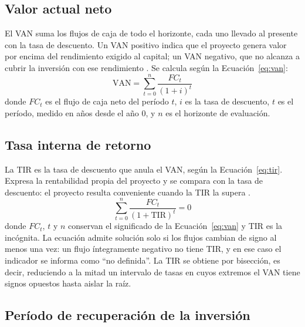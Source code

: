 \subsection{Valor actual neto}

El VAN suma los flujos de caja de todo el horizonte, cada uno llevado al presente con la tasa de descuento. Un VAN positivo indica que el proyecto genera valor por encima del rendimiento exigido al capital; un VAN negativo, que no alcanza a cubrir la inversión con ese rendimiento \parencite{RossEtAl2013}. Se calcula según la Ecuación~\eqref{eq:van}:
\begin{equation}
  \label{eq:van}
  \text{VAN} = \sum_{t=0}^{n} \frac{FC_t}{(1+i)^t}
\end{equation}
donde $FC_t$ es el flujo de caja neto del período $t$, $i$ es la tasa de descuento, $t$ es el período, medido en años desde el año 0, y $n$ es el horizonte de evaluación.

\subsection{Tasa interna de retorno}

La TIR es la tasa de descuento que anula el VAN, según la Ecuación~\eqref{eq:tir}. Expresa la rentabilidad propia del proyecto y se compara con la tasa de descuento: el proyecto resulta conveniente cuando la TIR la supera \parencite{RossEtAl2013}.
\begin{equation}
  \label{eq:tir}
  \sum_{t=0}^{n} \frac{FC_t}{(1+\text{TIR})^t} = 0
\end{equation}
donde $FC_t$, $t$ y $n$ conservan el significado de la Ecuación~\eqref{eq:van} y TIR es la incógnita. La ecuación admite solución solo si los flujos cambian de signo al menos una vez: un flujo íntegramente negativo no tiene TIR, y en ese caso el indicador se informa como \enquote{no definida}. La TIR se obtiene por bisección, es decir, reduciendo a la mitad un intervalo de tasas en cuyos extremos el VAN tiene signos opuestos hasta aislar la raíz.

\subsection{Período de recuperación de la inversión}

